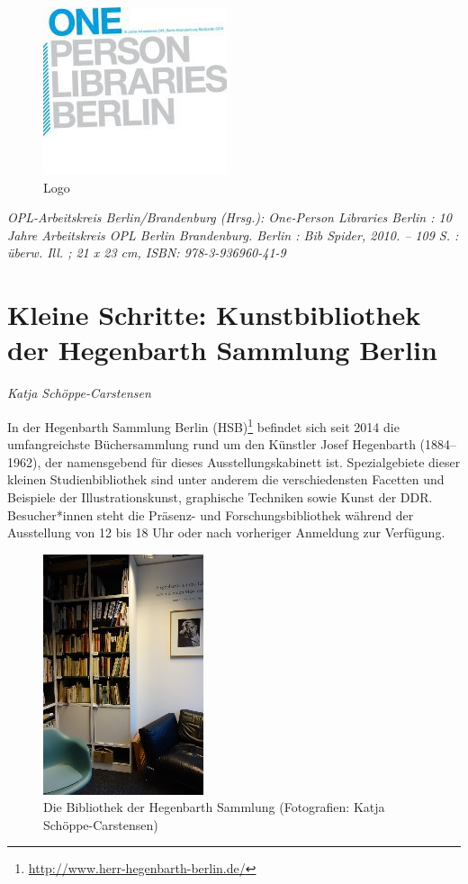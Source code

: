 \documentclass[a4paper,
fontsize=11pt,
oneside,
numbers=noperiodatend,
parskip=half-,
bibliography=totoc,
final
]{scrartcl}
\begin{document}
\begin{figure}
\centering
\includegraphics{img/Aleks_Einl_1.jpg}
\caption{Logo}
\end{figure}

\emph{OPL-Arbeitskreis Berlin/Brandenburg (Hrsg.): One-Person Libraries
Berlin : 10 Jahre Arbeitskreis OPL Berlin Brandenburg. Berlin : Bib
Spider, 2010. -- 109 S. : überw. Ill. ; 21 x 23 cm, ISBN:
978-3-936960-41-9}

\hypertarget{kleine-schritte-kunstbibliothek-der-hegenbarth-sammlung-berlin}{%
\section*{Kleine Schritte: Kunstbibliothek der Hegenbarth Sammlung
Berlin}\label{kleine-schritte-kunstbibliothek-der-hegenbarth-sammlung-berlin}}

\emph{Katja Schöppe-Carstensen}

In der Hegenbarth Sammlung Berlin (HSB)\footnote{\url{http://www.herr-hegenbarth-berlin.de/}}
befindet sich seit 2014 die umfangreichste Büchersammlung rund um den
Künstler Josef Hegenbarth (1884--1962), der namensgebend für dieses
Ausstellungskabinett ist. Spezialgebiete dieser kleinen
Studienbibliothek sind unter anderem die verschiedensten Facetten und
Beispiele der Illustrationskunst, graphische Techniken sowie Kunst der
DDR. Besucher*innen steht die Präsenz- und Forschungsbibliothek während
der Ausstellung von 12 bis 18 Uhr oder nach vorheriger Anmeldung zur
Verfügung.

\begin{figure}
\centering
\includegraphics{img/Schoeppe_1.jpg}
\caption{Die Bibliothek der Hegenbarth Sammlung (Fotografien: Katja
Schöppe-Carstensen)}
\end{figure}
\end{document}
